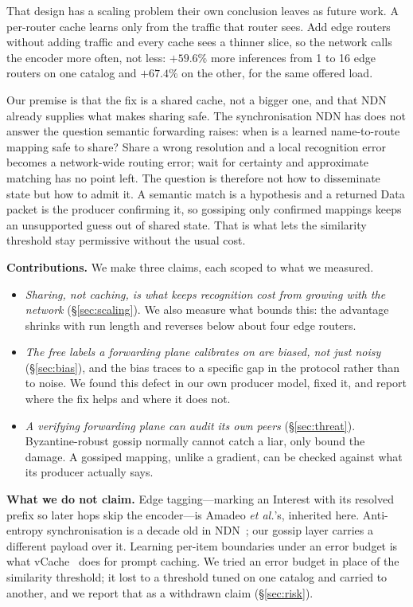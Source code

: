 \documentclass[conference,a4paper]{IEEEtran}
\begin{document}
That design has a scaling problem their own conclusion leaves as future work.
A per-router cache learns only from the traffic that router sees. Add edge
routers without adding traffic and every cache sees a thinner slice, so the
network calls the encoder more often, not less: $+59.6\%$ more inferences
from 1 to 16 edge routers on one catalog and $+67.4\%$ on the other, for the
same offered load.

Our premise is that the fix is a shared cache, not a bigger one, and that
NDN already supplies what makes sharing safe. The synchronisation NDN has
does not answer the question semantic forwarding raises: when is a learned
name-to-route mapping safe to share? Share a wrong resolution and a local
recognition error becomes a network-wide routing error; wait for certainty
and approximate matching has no point left. The question is therefore not
how to disseminate state but how to admit it. A semantic match is a
hypothesis and a returned Data packet is the producer confirming it, so
gossiping only confirmed mappings keeps an unsupported guess out of shared
state. That is what lets the similarity threshold stay permissive without
the usual cost.

\textbf{Contributions.} We make three claims, each scoped to what we
measured.

\begin{itemize}
\item \emph{Sharing, not caching, is what keeps recognition cost from
growing with the network} (\S\ref{sec:scaling}). We also measure what bounds
this: the advantage shrinks with run length and reverses below about four
edge routers.
\item \emph{The free labels a forwarding plane calibrates on are biased,
not just noisy} (\S\ref{sec:bias}), and the bias traces to a specific
gap in the protocol rather than to noise. We found this defect in our
own producer model, fixed it, and report where the fix helps and where
it does not.
\item \emph{A verifying forwarding plane can audit its own peers}
(\S\ref{sec:threat}). Byzantine-robust gossip normally cannot catch a
liar, only bound the damage. A gossiped mapping, unlike a gradient, can
be checked against what its producer actually says.
\end{itemize}

\textbf{What we do not claim.} Edge tagging---marking an Interest with its
resolved prefix so later hops skip the encoder---is Amadeo \emph{et al.}'s,
inherited here. Anti-entropy synchronisation is a decade old in
NDN~\cite{zhu2013chronosync,hoque2013nlsr}; our gossip layer carries a
different payload over it. Learning per-item boundaries under an error budget
is what vCache~\cite{schroeder2025vcache} does for prompt caching. We tried
an error budget in place of the similarity threshold; it lost to a threshold
tuned on one catalog and carried to another, and we report that as a
withdrawn claim (\S\ref{sec:risk}).
\end{document}
